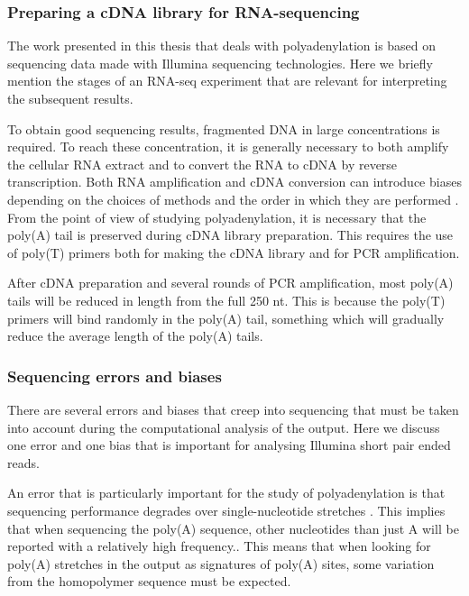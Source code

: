 \subsubsection{Preparing a cDNA library for RNA-sequencing}
The work presented in this thesis that deals with polyadenylation is based on
sequencing data made with Illumina sequencing technologies. Here we briefly
mention the stages of an RNA-seq experiment that are relevant for interpreting
the subsequent results.

To obtain good sequencing results, fragmented DNA in large concentrations is
required. To reach these concentration, it is generally necessary to both
amplify the cellular RNA extract and to convert the RNA to cDNA by reverse
transcription. Both RNA amplification and cDNA conversion can introduce biases
depending on the choices of methods and the order in which they are performed
\cite{wang_rna-seq:_2009}. From the point of view of studying polyadenylation,
it is necessary that the poly(A) tail is preserved during cDNA library
preparation. This requires the use of poly(T) primers both for making the cDNA
library and for PCR amplification.

After cDNA preparation and several rounds of PCR amplification, most poly(A)
tails will be reduced in length from the full 250 nt. This is because the
poly(T) primers will bind randomly in the poly(A) tail, something which will
gradually reduce the average length of the poly(A) tails.

\subsubsection{Sequencing errors and biases}
There are several errors and biases that creep into sequencing that must be
taken into account during the computational analysis of the output. Here we
discuss one error and one bias that is important for analysing Illumina short
pair ended reads.

An error that is particularly important for the study of polyadenylation is
that sequencing performance degrades over single-nucleotide stretches
\cite{minoche_evaluation_2011}. This implies that when sequencing the poly(A)
sequence, other nucleotides than just A will be reported with a relatively high
frequency.. This means that when looking for poly(A) stretches in the output as
signatures of poly(A) sites, some variation from the homopolymer sequence must
be expected.

